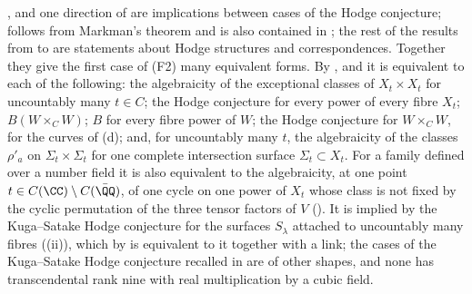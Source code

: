 \begin{remark}\label{rem:mumfordpowersopen}
,  and one direction of
 are implications between cases of the Hodge
conjecture;  follows from Markman's theorem and
is also contained in \cite{Li26}; the rest of the results from
 to  are statements about
Hodge structures and correspondences. Together they give the first case of
(F2) many equivalent forms. By ,  and
 it is equivalent to each of the following: the
algebraicity of the exceptional classes of $X_{t}\times X_{t}$ for uncountably
many $t\in C$; the Hodge conjecture for every power of every fibre $X_{t}$;
$B(W\times_{C}W)$; $B$ for every fibre power of $W$; the Hodge conjecture for
$W\times_{C}W$, for the curves of (d); and, for
uncountably many $t$, the algebraicity of the classes $\rho'_{a}$ on
$\Sigma_{t}\times\Sigma_{t}$ for one complete intersection surface
$\Sigma_{t}\subset X_{t}$. For a family defined over a number field it is
also equivalent to the algebraicity, at one point $t\in C(\CC)\setminus
C(\bar{\QQ})$, of one cycle on one power of $X_{t}$ whose class is not fixed
by the cyclic permutation of the three tensor factors of $V$
(). It is implied by the Kuga--Satake Hodge
conjecture for the surfaces $S_{\lambda}$ attached to uncountably many fibres
((ii)), which by  is equivalent
to it together with a link; the cases of the Kuga--Satake Hodge conjecture
recalled in  are of other shapes, and none has
transcendental rank nine with real multiplication by a cubic field.


\end{remark}
